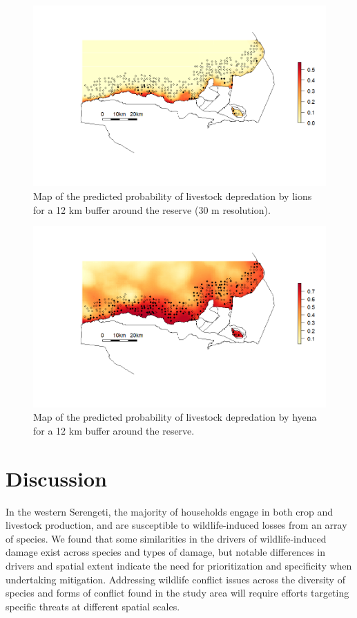 \documentclass[12pt,]{article}
\begin{document}
\begin{figure}[H]
    \centering
    \includegraphics[width=\textwidth]{Figures/lion_predictionmap.png} %
    \caption{Map of the predicted probability of livestock depredation by lions for a 12 km buffer around the reserve (30 m resolution).}
    \label{fig:lionpred}
\end{figure}

\begin{figure}[H]
    \centering
    \includegraphics[width=\textwidth]{Figures/hyena_predictionmap.png} %
    \caption{Map of the predicted probability of livestock depredation by hyena for a 12 km buffer around the reserve.}
    \label{fig:hyenapred}
\end{figure}

\section{Discussion}
In the western Serengeti, the majority of households engage in both crop and livestock production, and are susceptible to wildlife-induced losses from an array of species. We found that some similarities in the drivers of wildlife-induced damage exist across species and types of damage, but notable differences in drivers and spatial extent indicate the need for prioritization and specificity when undertaking mitigation. Addressing wildlife conflict issues across the diversity of species and forms of conflict found in the study area will require efforts targeting specific threats at different spatial scales. 
\end{document}
